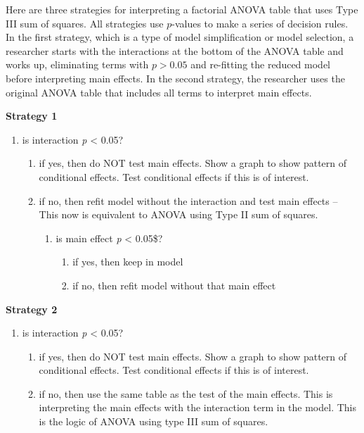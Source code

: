 \documentclass[]{book}
\providecommand{\tightlist}{%
  \setlength{\itemsep}{0pt}\setlength{\parskip}{0pt}}
\begin{document}
Here are three strategies for interpreting a factorial ANOVA table that
uses Type III sum of squares. All strategies use \(p\)-values to make a
series of decision rules. In the first strategy, which is a type of
model simplification or model selection, a researcher starts with the
interactions at the bottom of the ANOVA table and works up, eliminating
terms with \(p > 0.05\) and re-fitting the reduced model before
interpreting main effects. In the second strategy, the researcher uses
the original ANOVA table that includes all terms to interpret main
effects.

\textbf{Strategy 1}

\begin{enumerate}
\def\labelenumi{\arabic{enumi}.}
\tightlist
\item
  is interaction \emph{p} \textless{} 0.05?

  \begin{enumerate}
  \def\labelenumii{\alph{enumii}.}
  \tightlist
  \item
    if yes, then do NOT test main effects. Show a graph to show pattern
    of conditional effects. Test conditional effects if this is of
    interest.
  \item
    if no, then refit model without the interaction and test main
    effects -- This now is equivalent to ANOVA using Type II sum of
    squares.

    \begin{enumerate}
    \def\labelenumiii{\arabic{enumiii}.}
    \setcounter{enumiii}{1}
    \tightlist
    \item
      is main effect \emph{p} \textless{} 0.05\$?

      \begin{enumerate}
      \def\labelenumiv{\alph{enumiv}.}
      \tightlist
      \item
        if yes, then keep in model
      \item
        if no, then refit model without that main effect
      \end{enumerate}
    \end{enumerate}
  \end{enumerate}
\end{enumerate}

\textbf{Strategy 2}

\begin{enumerate}
\def\labelenumi{\arabic{enumi}.}
\setcounter{enumi}{1}
\tightlist
\item
  is interaction \emph{p} \textless{} 0.05?

  \begin{enumerate}
  \def\labelenumii{\alph{enumii}.}
  \tightlist
  \item
    if yes, then do NOT test main effects. Show a graph to show pattern
    of conditional effects. Test conditional effects if this is of
    interest.
  \item
    if no, then use the same table as the test of the main effects. This
    is interpreting the main effects with the interaction term in the
    model. This is the logic of ANOVA using type III sum of squares.
  \end{enumerate}
\end{enumerate}
\end{document}
